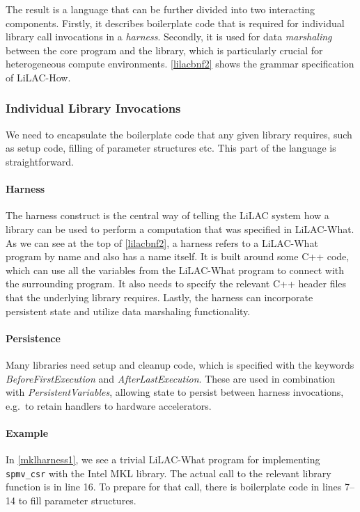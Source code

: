     The result is a language that can be further divided into two interacting
    components.
    Firstly, it describes boilerplate code that is required for individual library
    call invocations in a {\em harness}.
    Secondly, it is used for data {\em marshaling} between the core program and the
    library, which is particularly crucial for heterogeneous compute environments.
    \autoref{lilacbnf2} shows the grammar specification of LiLAC-How.

\subsubsection{Individual Library Invocations}
We need to encapsulate the boilerplate code that any given library requires,
such as setup code, filling of parameter structures etc.
This part of the language is straightforward.

\paragraph{Harness}
The harness construct is the central way of telling the LiLAC system how a
library can be used to perform a computation that was specified in LiLAC-What.
As we can see at the top of \autoref{lilacbnf2}, a harness refers to a
LiLAC-What program by name and also has a name itself.
It is built around some C++ code, which can use all the variables from the
LiLAC-What program to connect with the surrounding program.
It also needs to specify the relevant C++ header files
that the underlying library requires.
Lastly, the harness can incorporate persistent state and utilize data
marshaling functionality.

\paragraph{Persistence}
Many libraries need setup and cleanup code, which is specified with the
keywords {\em BeforeFirstExecution} and {\em AfterLastExecution}.
These are used in combination with {\em PersistentVariables}, allowing state to
persist between harness invocations, e.g.\ to retain handlers to hardware
accelerators.

\paragraph{Example}
In \autoref{mklharness1}, we see a trivial LiLAC-What program for implementing
\texttt{spmv\_csr} with the Intel MKL library.
The actual call to the relevant library function is in line 16.
To prepare for that call, there is boilerplate code in lines 7--14 to fill
parameter structures.

